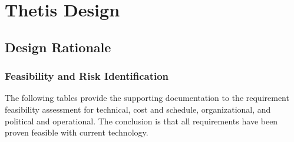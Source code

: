 \chapter{Thetis Design} \label{chap:thetis_design}

\section{Design Rationale} \label{sec:design_rationale}

\subsection{Feasibility and Risk Identification} \label{ssec:feasibility_risk}
The following tables provide the supporting documentation to the requirement feasibility assessment for technical, cost and schedule, organizational, and political and operational. The conclusion is that all requirements have been proven feasible with current technology.

